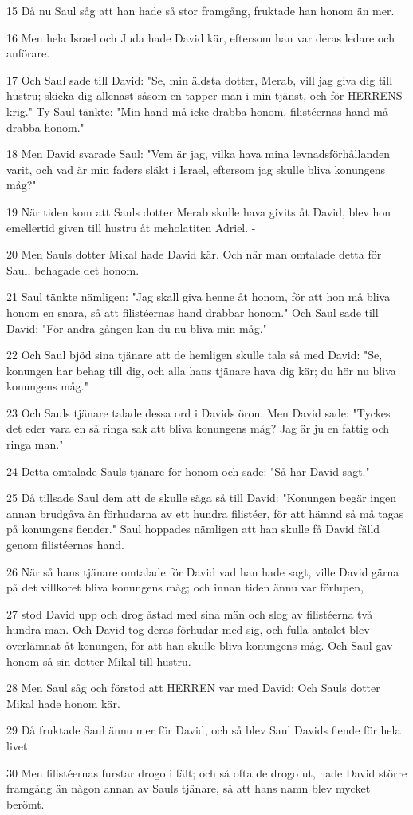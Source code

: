 \par 15 Då nu Saul såg att han hade så stor framgång, fruktade han honom än mer.
\par 16 Men hela Israel och Juda hade David kär, eftersom han var deras ledare och anförare.
\par 17 Och Saul sade till David: "Se, min äldsta dotter, Merab, vill jag giva dig till hustru; skicka dig allenast såsom en tapper man i min tjänst, och för HERRENS krig." Ty Saul tänkte: "Min hand må icke drabba honom, filistéernas hand må drabba honom."
\par 18 Men David svarade Saul: "Vem är jag, vilka hava mina levnadsförhållanden varit, och vad är min faders släkt i Israel, eftersom jag skulle bliva konungens måg?"
\par 19 När tiden kom att Sauls dotter Merab skulle hava givits åt David, blev hon emellertid given till hustru åt meholatiten Adriel. -
\par 20 Men Sauls dotter Mikal hade David kär. Och när man omtalade detta för Saul, behagade det honom.
\par 21 Saul tänkte nämligen: "Jag skall giva henne åt honom, för att hon må bliva honom en snara, så att filistéernas hand drabbar honom." Och Saul sade till David: "För andra gången kan du nu bliva min måg."
\par 22 Och Saul bjöd sina tjänare att de hemligen skulle tala så med David: "Se, konungen har behag till dig, och alla hans tjänare hava dig kär; du hör nu bliva konungens måg."
\par 23 Och Sauls tjänare talade dessa ord i Davids öron. Men David sade: "Tyckes det eder vara en så ringa sak att bliva konungens måg? Jag är ju en fattig och ringa man."
\par 24 Detta omtalade Sauls tjänare för honom och sade: "Så har David sagt."
\par 25 Då tillsade Saul dem att de skulle säga så till David: "Konungen begär ingen annan brudgåva än förhudarna av ett hundra filistéer, för att hämnd så må tagas på konungens fiender." Saul hoppades nämligen att han skulle få David fälld genom filistéernas hand.
\par 26 När så hans tjänare omtalade för David vad han hade sagt, ville David gärna på det villkoret bliva konungens måg; och innan tiden ännu var förlupen,
\par 27 stod David upp och drog åstad med sina män och slog av filistéerna två hundra man. Och David tog deras förhudar med sig, och fulla antalet blev överlämnat åt konungen, för att han skulle bliva konungens måg. Och Saul gav honom så sin dotter Mikal till hustru.
\par 28 Men Saul såg och förstod att HERREN var med David; Och Sauls dotter Mikal hade honom kär.
\par 29 Då fruktade Saul ännu mer för David, och så blev Saul Davids fiende för hela livet.
\par 30 Men filistéernas furstar drogo i fält; och så ofta de drogo ut, hade David större framgång än någon annan av Sauls tjänare, så att hans namn blev mycket berömt.

